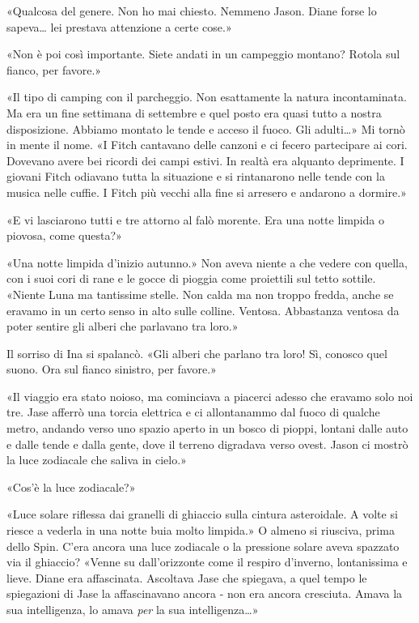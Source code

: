 «Qualcosa del genere. Non ho mai chiesto. Nemmeno Jason. Diane forse lo
sapeva\ldots{} lei prestava attenzione a certe cose.»

«Non è poi così importante. Siete andati in un campeggio montano? Rotola
sul fianco, per favore.»

«Il tipo di camping con il parcheggio. Non esattamente la natura
incontaminata. Ma era un fine settimana di settembre e quel posto era
quasi tutto a nostra disposizione. Abbiamo montato le tende e acceso il
fuoco. Gli adulti\ldots» Mi tornò in mente il nome. «I Fitch cantavano
delle canzoni e ci fecero partecipare ai cori. Dovevano avere bei
ricordi dei campi estivi. In realtà era alquanto deprimente. I giovani
Fitch odiavano tutta la situazione e si rintanarono nelle tende con la
musica nelle cuffie. I Fitch più vecchi alla fine si arresero e andarono
a dormire.»

«E vi lasciarono tutti e tre attorno al falò morente. Era una notte
limpida o piovosa, come questa?»

«Una notte limpida d'inizio autunno.» Non aveva niente a che vedere con
quella, con i suoi cori di rane e le gocce di pioggia come proiettili
sul tetto sottile. «Niente Luna ma tantissime stelle. Non calda ma non
troppo fredda, anche se eravamo in un certo senso in alto sulle colline.
Ventosa. Abbastanza ventosa da poter sentire gli alberi che parlavano
tra loro.»

Il sorriso di Ina si spalancò. «Gli alberi che parlano tra loro! Sì,
conosco quel suono. Ora sul fianco sinistro, per favore.»

«Il viaggio era stato noioso, ma cominciava a piacerci adesso che
eravamo solo noi tre. Jase afferrò una torcia elettrica e ci
allontanammo dal fuoco di qualche metro, andando verso uno spazio aperto
in un bosco di pioppi, lontani dalle auto e dalle tende e dalla gente,
dove il terreno digradava verso ovest. Jason ci mostrò la luce zodiacale
che saliva in cielo.»

«Cos'è la luce zodiacale?»

«Luce solare riflessa dai granelli di ghiaccio sulla cintura
asteroidale. A volte si riesce a vederla in una notte buia molto
limpida.» O almeno si riusciva, prima dello Spin. C'era ancora una luce
zodiacale o la pressione solare aveva spazzato via il ghiaccio? «Venne
su dall'orizzonte come il respiro d'inverno, lontanissima e lieve. Diane
era affascinata. Ascoltava Jase che spiegava, a quel tempo le
spiegazioni di Jase la affascinavano ancora - non era ancora cresciuta.
Amava la sua intelligenza, lo amava \emph{per} la sua
intelligenza\ldots»


